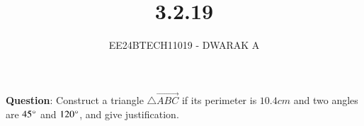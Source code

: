\documentclass[journal]{IEEEtran}
\begin{document}

\vspace{3cm}

\title{3.2.19}
\author{EE24BTECH11019 - DWARAK A}
{\let\newpage\relax\maketitle}

\renewcommand{\thefigure}{\theenumi}
\renewcommand{\thetable}{\theenumi}
\setlength{\intextsep}{10pt} %


\renewcommand{\thetable}{\theenumi}


\textbf{Question}:
Construct a triangle $\triangle\vec{ABC}$ if its perimeter is $10.4cm$ and two angles are $45\degree$ and $120\degree$, and give justification.
\end{document}
